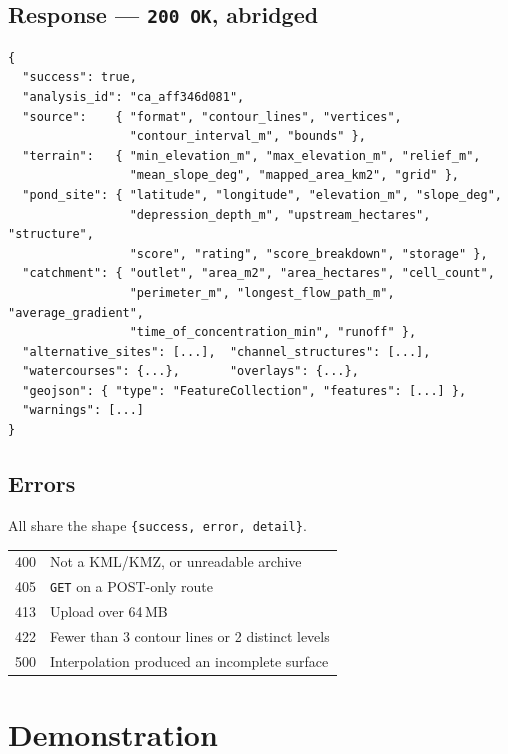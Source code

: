 \documentclass[11pt,a4paper]{article}
\newenvironment{codebox}{%
  \par\addvspace{5pt}%
  \def\FrameCommand{\fboxsep=7pt\colorbox{shadecolor}}%
  \MakeFramed{\FrameRestore}\noindent%
}{\par\endMakeFramed\addvspace{5pt}}
\begin{document}
\subsection{Response --- \texttt{200 OK}, abridged}

\begin{codebox}
\begin{lstlisting}[style=plainstyle]
{
  "success": true,
  "analysis_id": "ca_aff346d081",
  "source":    { "format", "contour_lines", "vertices",
                 "contour_interval_m", "bounds" },
  "terrain":   { "min_elevation_m", "max_elevation_m", "relief_m",
                 "mean_slope_deg", "mapped_area_km2", "grid" },
  "pond_site": { "latitude", "longitude", "elevation_m", "slope_deg",
                 "depression_depth_m", "upstream_hectares", "structure",
                 "score", "rating", "score_breakdown", "storage" },
  "catchment": { "outlet", "area_m2", "area_hectares", "cell_count",
                 "perimeter_m", "longest_flow_path_m", "average_gradient",
                 "time_of_concentration_min", "runoff" },
  "alternative_sites": [...],  "channel_structures": [...],
  "watercourses": {...},       "overlays": {...},
  "geojson": { "type": "FeatureCollection", "features": [...] },
  "warnings": [...]
}
\end{lstlisting}
\end{codebox}

\subsection{Errors}

All share the shape \texttt{\{success, error, detail\}}.

\begin{table}[H]
\centering\small
\begin{tabular}{@{}ll@{}}
\toprule
400 & Not a KML/KMZ, or unreadable archive \\
405 & \texttt{GET} on a POST-only route \\
413 & Upload over 64\,MB \\
422 & Fewer than 3 contour lines or 2 distinct levels \\
500 & Interpolation produced an incomplete surface \\
\bottomrule
\end{tabular}
\end{table}

\section{Demonstration}
\label{sec:demo}
\end{document}
